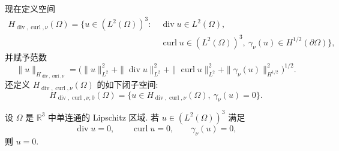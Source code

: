 现在定义空间
\[
 \begin{aligned}
 H_{\operatorname{div},\operatorname{curl},\nu}(\Omega)
 =\{u\in(L^2(\Omega))^3:
 &\ \operatorname{div}u\in L^2(\Omega),\\
 &\ \operatorname{curl}u\in(L^2(\Omega))^3,
 \ \gamma_\nu(u)\in H^{1/2}(\partial\Omega)\},
 \end{aligned}
\]
并赋予范数
\[
 \|u\|_{H_{\operatorname{div},\operatorname{curl},\nu}}
 =\bigl(\|u\|_{L^2}^2+\|\operatorname{div}u\|_{L^2}^2
 +\|\operatorname{curl}u\|_{L^2}^2
 +\|\gamma_\nu(u)\|_{H^{1/2}}^2\bigr)^{1/2}.
\]
还定义 $H_{\operatorname{div},\operatorname{curl},\nu}(\Omega)$ 的如下闭子空间:
\begin{equation}
 H_{\operatorname{div},\operatorname{curl},\nu,0}(\Omega)
 =\{u\in H_{\operatorname{div},\operatorname{curl},\nu}(\Omega),\ \gamma_\nu(u)=0\}.
 \label{eq:chap4-hdivcurlnu-zero-space}
\end{equation}

\begin{Lemma}
\label{lem:chap4-divcurl-zero-kernel}
设 $\Omega$ 是 $\mathbb R^3$ 中单连通的 Lipschitz 区域. 若 $u\in(L^2(\Omega))^3$ 满足
\[
 \operatorname{div}u=0,\qquad
 \operatorname{curl}u=0,\qquad
 \gamma_\nu(u)=0,
\]
则 $u=0$.
\end{Lemma}

